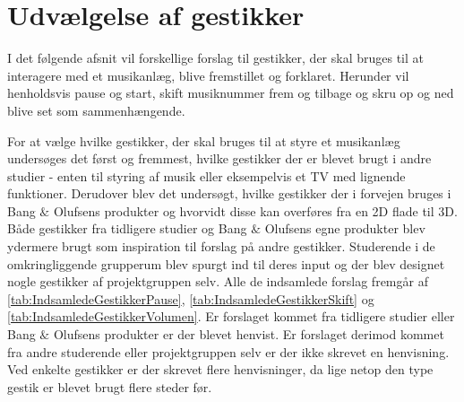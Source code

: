 \section{Udvælgelse af gestikker}
\label{UdvaelgelseAfGestikker}
%
I det følgende afsnit vil forskellige forslag til gestikker, der skal bruges til at interagere med et musikanlæg, blive fremstillet og forklaret. Herunder vil henholdsvis pause og start, skift musiknummer frem og tilbage og skru op og ned blive set som sammenhængende.
 
For at vælge hvilke gestikker, der skal bruges til at styre et musikanlæg undersøges det først og fremmest, hvilke gestikker der er blevet brugt i andre studier - enten til styring af musik eller eksempelvis et TV med lignende funktioner. Derudover blev det undersøgt, hvilke gestikker der i forvejen bruges i Bang $\&$ Olufsens produkter og hvorvidt disse kan overføres fra en 2D flade til 3D. Både gestikker fra tidligere studier og Bang $\&$ Olufsens egne produkter blev ydermere brugt som inspiration til forslag på andre gestikker. Studerende i de omkringliggende grupperum blev spurgt ind til deres input og der blev designet nogle gestikker af projektgruppen selv. Alle de indsamlede forslag fremgår af \autoref{tab:IndsamledeGestikkerPause}, \autoref{tab:IndsamledeGestikkerSkift} og \autoref{tab:IndsamledeGestikkerVolumen}. Er forslaget kommet fra tidligere studier eller Bang $\&$ Olufsens produkter er der blevet henvist. Er forslaget derimod kommet fra andre studerende eller projektgruppen selv er der ikke skrevet en henvisning. Ved enkelte gestikker er der skrevet flere henvisninger, da lige netop den type gestik er blevet brugt flere steder før. 
%
